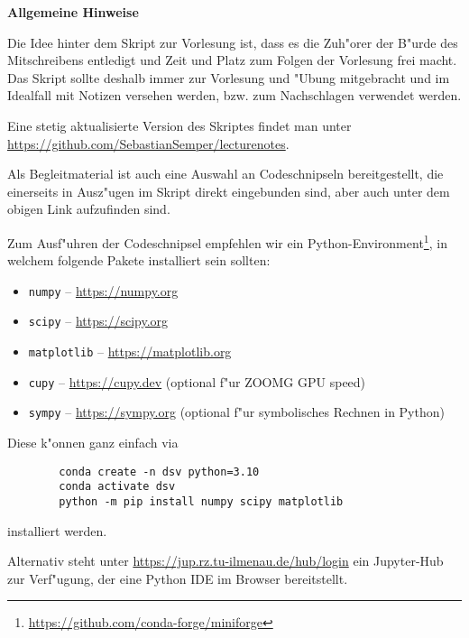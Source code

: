 \begin{center}
    \begin{minipage}{0.75\textwidth}
        \begin{center}
            \textbf{\large Allgemeine Hinweise}
        \end{center}
        Die Idee hinter dem Skript zur Vorlesung ist, dass es die Zuh"orer der B"urde des Mitschreibens entledigt und Zeit und Platz zum Folgen der Vorlesung frei macht.
        Das Skript sollte deshalb immer zur Vorlesung und "Ubung mitgebracht und im Idealfall mit Notizen versehen werden, bzw. zum Nachschlagen verwendet werden.

        Eine stetig aktualisierte Version des Skriptes findet man unter \url{https://github.com/SebastianSemper/lecturenotes}.

        Als Begleitmaterial ist auch eine Auswahl an Codeschnipseln bereitgestellt, die einerseits in Ausz"ugen im Skript direkt eingebunden sind, aber auch unter dem obigen Link aufzufinden sind.

        Zum Ausf"uhren der Codeschnipsel empfehlen wir ein Python-Environment\footnote{\url{https://github.com/conda-forge/miniforge}}, in welchem folgende Pakete installiert sein sollten:
        \begin{itemize}
            \item \texttt{numpy} -- \url{https://numpy.org}
            \item \texttt{scipy} -- \url{https://scipy.org}
            \item \texttt{matplotlib} -- \url{https://matplotlib.org}
            \item \texttt{cupy} -- \url{https://cupy.dev} (optional f"ur ZOOMG GPU speed)
            \item \texttt{sympy} -- \url{https://sympy.org} (optional f"ur symbolisches Rechnen in Python)
        \end{itemize}
        Diese k"onnen ganz einfach via
        \begin{verbatim}
        conda create -n dsv python=3.10
        conda activate dsv
        python -m pip install numpy scipy matplotlib
        \end{verbatim}
        installiert werden.

        Alternativ steht unter \url{https://jup.rz.tu-ilmenau.de/hub/login} ein Jupyter-Hub zur Verf"ugung, der eine Python IDE im Browser bereitstellt.
    \end{minipage}
\end{center}